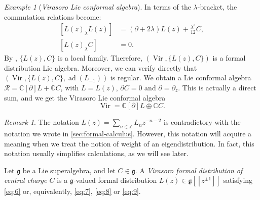 \documentclass[a4paper, 12pt, reqno]{amsart}
\theoremstyle{remark}
\newtheorem{remark}[theorem]{Remark}
\newtheorem{example}[theorem]{Example}
\DeclareMathOperator{\Vir}{Vir}
\DeclareMathOperator{\ad}{ad}
\begin{document}
\begin{example}[\emph{Virasoro Lie conformal algebra}]
  In terms of the $\lambda$-bracket, the commutation relations become:
  \begin{equation}
    \label{eq:9}
    \begin{split}
      [L(z)_{\lambda}L(z)] &= (\partial + 2\lambda)L(z) + \frac{\lambda^3}{12}C, \\
      [L(z)_{\lambda}C] &= 0.
    \end{split}
  \end{equation}
  By , $\{L(z), C\}$ is a local family.
  Therefore, $(\Vir, \{L(z), C\})$ is a formal distribution Lie algebra.
  Moreover, we can verify directly that $(\Vir, \{L(z), C\}, \ad(L_{-1}))$ is regular.
  We obtain a Lie conformal algebra $\mathcal{R} = \mathbb{C}[\partial]L + \mathbb{C}C$, with $L = L(z)$, $\partial C = 0$ and $\partial = \partial_z$.
  This is actually a direct sum, and we get the Virasoro Lie conformal algebra
  \begin{equation*}
    \Vir = \mathbb{C}[\partial]L \oplus \mathbb{C}C.
  \end{equation*}
\end{example}

\begin{remark}
  \label{rmk:8}
  The notation $L(z) = \sum_{n \in \mathbb{Z}}L_nz^{-n - 2}$ is contradictory with the notation we wrote in \cref{sec:formal-calculus}.
  However, this notation will acquire a meaning when we treat the notion of weight of an eigendistribution.
  In fact, this notation usually simplifies calculations, as we will see later.
\end{remark}

Let $\mathfrak{g}$ be a Lie superalgebra, and let $C \in \mathfrak{g}$.
A \emph{Virasoro formal distribution of central charge $C$} is a $\mathfrak{g}$-valued formal distribution $L(z) \in \mathfrak{g}[[z^{\pm1}]]$ satisfying \eqref{eq:6} or, equivalently, \eqref{eq:7}, \eqref{eq:8} or \eqref{eq:9}.
\end{document}

